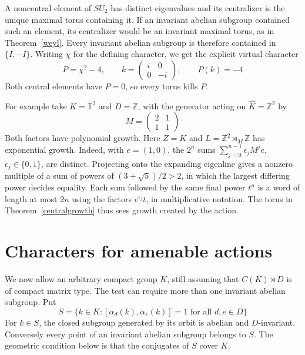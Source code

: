 \documentclass[11pt,a4paper]{article}
\theoremstyle{remark}
\begin{document}
A noncentral element of $SU_2$ has distinct eigenvalues
and its centralizer is the unique maximal torus containing it. If an invariant abelian
subgroup contained such an element, its centralizer would be an invariant
maximal torus, as in Theorem~\ref{weyl}. Every invariant abelian subgroup
is therefore contained in $\{I,-I\}$. Writing $\chi$ for the defining
character, we get the explicit virtual character
\[
 P=\chi^2-4,\qquad k=\begin{pmatrix}i&0\\0&-i\end{pmatrix},\qquad P(k)=-4
\]
Both central elements have $P=0$, so every torus kills $P$.

For example take $K=\mathbb T^2$ and $D=\mathbb Z$, with the generator
acting on $\widehat K=\mathbb Z^2$ by
\[
 M=\begin{pmatrix}2&1\\1&1\end{pmatrix}
\]
Both factors have polynomial growth. Here $Z=K$ and
$L=\mathbb Z^2\rtimes_M\mathbb Z$ has exponential growth. Indeed, with
$e=(1,0)$, the $2^n$ sums $\sum_{j=0}^{n-1}\epsilon_jM^je$,
$\epsilon_j\in\{0,1\}$, are distinct. Projecting onto the expanding
eigenline gives a nonzero multiple of a sum of powers of
$(3+\sqrt5)/2>2$, in which the largest differing power decides equality.
Each sum followed by the same final power $t^n$ is a word of length at
most $2n$ using the factors $e^{\epsilon_j}t$, in multiplicative
notation. The torus in Theorem~\ref{centralgrowth} thus sees growth
created by the action.

\section{Characters for amenable actions}\label{seccharacters}

We now allow an arbitrary compact group $K$, still assuming that
$C(K)\rtimes D$ is of compact matrix type. The test can require more
than one invariant abelian subgroup. Put
\[
 S=\{k\in K : [\alpha_d(k),\alpha_e(k)]=1 \text{ for all }d,e\in D\}
\]
For $k\in S$, the closed subgroup generated by its orbit is abelian
and $D$-invariant. Conversely every point of an invariant abelian
subgroup belongs to $S$. The geometric condition below is that the conjugates of $S$ cover $K$.
\end{document}
